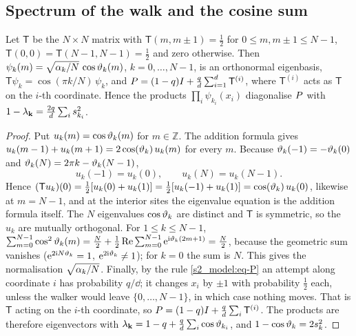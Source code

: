 \subsection{Spectrum of the walk and the cosine sum}

\begin{lemma}\label{appA_proofs:lem-spectrum}
Let $\mathsf T$ be the $N\times N$ matrix with $\mathsf T(m,m\pm1)=\tfrac12$ for $0\le m,m\pm1\le N-1$,
$\mathsf T(0,0)=\mathsf T(N-1,N-1)=\tfrac12$ and zero otherwise.  Then
$\psi_k(m)=\sqrt{\alpha_{k}/N}\,\cos\vartheta_{k}(m)$, $k=0,\dots,N-1$, is an orthonormal eigenbasis,
$\mathsf T\psi_k=\cos(\pi k/N)\,\psi_k$, and
$P=(1-q)I+\frac{q}{d}\sum_{i=1}^{d}\mathsf T^{(i)}$, where $\mathsf T^{(i)}$ acts as $\mathsf T$ on the $i$-th coordinate.
Hence the products $\prod_i\psi_{k_i}(x_i)$ diagonalise $P$ with
$1-\lambda_{\mathbf{k}}=\frac{2q}{d}\sum_is_{k_i}^{2}$.
\end{lemma}

\begin{proof}
Put $u_k(m)=\cos\vartheta_{k}(m)$ for $m\in\mathbb Z$. The addition formula gives
$u_k(m-1)+u_k(m+1)=2\cos(\vartheta_{k})\,u_k(m)$ for every $m$. Because $\vartheta_{k}(-1)=-\vartheta_{k}(0)$ and
$\vartheta_{k}(N)=2\pi k-\vartheta_{k}(N-1)$,
\begin{equation}\label{appA_proofs:eq-bdry}
  u_k(-1)=u_k(0),\qquad u_k(N)=u_k(N-1).
\end{equation}
Hence $(\mathsf T u_k)(0)=\tfrac12[u_k(0)+u_k(1)]=\tfrac12[u_k(-1)+u_k(1)]=\cos(\vartheta_{k})\,u_k(0)$, likewise at
$m=N-1$, and at the interior sites the eigenvalue equation is the addition formula itself. The $N$ eigenvalues
$\cos\vartheta_{k}$ are distinct and $\mathsf T$ is symmetric, so the $u_k$ are mutually orthogonal. For $1\le k\le N-1$,
$\sum_{m=0}^{N-1}\cos^{2}\vartheta_{k}(m)=\frac N2+\frac12\,\mathrm{Re}\sum_{m=0}^{N-1}\mathrm{e}^{\mathrm{i}\vartheta_{k}(2m+1)}=\frac N2$,
because the geometric sum vanishes ($\mathrm{e}^{2\mathrm{i} N\vartheta_{k}}=1$, $\mathrm{e}^{2\mathrm{i}\vartheta_{k}}\ne1$); for $k=0$ the sum is $N$.
This gives the normalisation $\sqrt{\alpha_{k}/N}$. Finally, by the rule \eqref{s2_model:eq-P} an attempt along
coordinate $i$ has probability $q/\dd$; it changes $x_i$ by $\pm1$ with probability $\tfrac12$ each, unless the
walker would leave $\{0,\dots,N-1\}$, in which case nothing moves. That is $\mathsf T$ acting on the $i$-th
coordinate, so $P=(1-q)I+\frac q{d}\sum_i\mathsf T^{(i)}$. The products are therefore eigenvectors with
$\lambda_{\mathbf{k}}=1-q+\frac q{d}\sum_i\cos\vartheta_{k_i}$, and $1-\cos\vartheta_{k}=2s_{k}^{2}$.
\end{proof}

